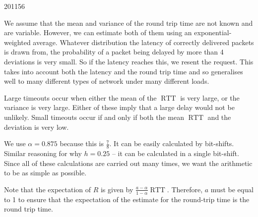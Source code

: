 \documentclass[10pt,\jkfside,a4paper]{article}
\begin{document}
\begin{examquestion}{2011}{5}{6}
\begin{enumerate}
\begin{enumerate}[label=(\roman*)]
We assume that the mean and variance of the round trip time are not known
and are variable. However, we can estimate both of them using an
exponential-weighted average. Whatever distribution the latency of
correctly delivered packets is drawn from, the probability of a packet
being delayed by more than 4 deviations is very small. So if the latency
reaches this, we resent the request. This takes into account both the
latency and the round trip time and so generalises well to many different
types of network under many different loads.

Large timeouts occur when either the mean of the $\mathop{RTT}$ is very
large, or the variance is very large. Either of these imply that a large
delay would not be unlikely. Small timeouts occur if and only if both the
mean $\mathop{RTT}$ and the deviation is very low.

We use $\alpha = 0.875$ because this is $\frac{7}{8}$. It can be easily
calculated by bit-shifts. Similar reasoning for why $h = 0.25$ -- it can be
calculated in a single bit-shift. Since all of these calculations are
carried out many times, we want the arithmetic to be as simple as possible.

Note that the expectation of $R$ is given by $\frac{a -
\alpha}{1 - \alpha}\mathop{RTT}$. Therefore, $a$ must be equal to 1 to
ensure that the expectation of the estimate for the round-trip time is the
round trip time.

\end{enumerate}

\end{enumerate}

\end{examquestion}
\end{document}
